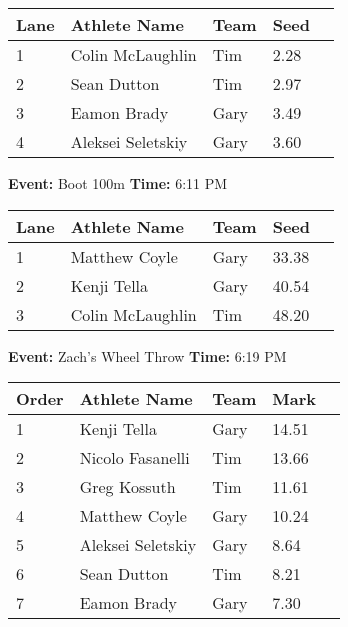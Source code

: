 \documentclass[10pt]{article}
\begin{document}
\vspace{1em}
\begin{tabular}{@{}lllll@{}}
\toprule

\textbf{Lane} & \textbf{Athlete Name} & \textbf{Team} & \textbf{Seed} \\
\midrule
1 & Colin McLaughlin & Tim & 2.28 &\\
2 & Sean Dutton & Tim & 2.97 &\\
3 & Eamon Brady & Gary & 3.49 &\\
4 & Aleksei Seletskiy & Gary & 3.60 &\\
\bottomrule
\end{tabular}
\vspace{2.5em}


\textbf{Event:} Boot 100m \quad \textbf{Time:} 6:11 PM 

\vspace{1em}
\begin{tabular}{@{}lllll@{}}
\toprule

\textbf{Lane} & \textbf{Athlete Name} & \textbf{Team} & \textbf{Seed} \\
\midrule
1 & Matthew Coyle & Gary & 33.38 &\\
2 & Kenji Tella & Gary & 40.54 &\\
3 & Colin McLaughlin & Tim & 48.20 &\\
\bottomrule
\end{tabular}
\vspace{2.5em}


\textbf{Event:} Zach's Wheel Throw \quad \textbf{Time:} 6:19 PM 

\vspace{1em}
\begin{tabular}{@{}lllll@{}}
\toprule

\textbf{Order} & \textbf{Athlete Name} & \textbf{Team} & \textbf{Mark} \\
\midrule
1 & Kenji Tella & Gary & 14.51 &\\
2 & Nicolo Fasanelli & Tim & 13.66 &\\
3 & Greg Kossuth & Tim & 11.61 &\\
4 & Matthew Coyle & Gary & 10.24 &\\
5 & Aleksei Seletskiy & Gary & 8.64 &\\
6 & Sean Dutton & Tim & 8.21 &\\
7 & Eamon Brady & Gary & 7.30 &\\
\bottomrule
\end{tabular}
\vspace{2.5em}
\end{document}
